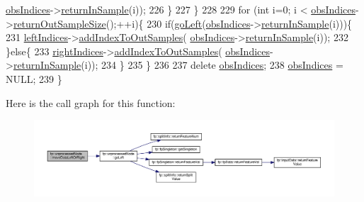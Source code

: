 \begin{DoxyCode}
      \hyperlink{classfp_1_1unprocessedNode_aba9f03124658f62906fa8ded53cef535}{obsIndices}->\hyperlink{classfp_1_1stratifiedInNodeClassIndices_a2d7e802fb97db0367bb8e8f31d393afd}{returnInSample}(i)); 
226                         \}
227                     \}
228 
229                     \textcolor{keywordflow}{for} (\textcolor{keywordtype}{int} i=0; i < \hyperlink{classfp_1_1unprocessedNode_aba9f03124658f62906fa8ded53cef535}{obsIndices}->\hyperlink{classfp_1_1stratifiedInNodeClassIndices_a6630b77af340d2023d88bafa87b94cae}{returnOutSampleSize}();++i)\{
230                         \textcolor{keywordflow}{if}(\hyperlink{classfp_1_1unprocessedNode_ad4ffdb4f4b91d6d21f8954f3c80a3617}{goLeft}(\hyperlink{classfp_1_1unprocessedNode_aba9f03124658f62906fa8ded53cef535}{obsIndices}->\hyperlink{classfp_1_1stratifiedInNodeClassIndices_a2d7e802fb97db0367bb8e8f31d393afd}{returnInSample}(i)))\{
231                             \hyperlink{classfp_1_1unprocessedNode_a8e39fa0144bbb78fd02d1973bd05b5f6}{leftIndices}->\hyperlink{classfp_1_1stratifiedInNodeClassIndices_adc99a046031545bc59c2b43abcf75ed9}{addIndexToOutSamples}(
      \hyperlink{classfp_1_1unprocessedNode_aba9f03124658f62906fa8ded53cef535}{obsIndices}->\hyperlink{classfp_1_1stratifiedInNodeClassIndices_a2d7e802fb97db0367bb8e8f31d393afd}{returnInSample}(i)); 
232                         \}\textcolor{keywordflow}{else}\{
233                             \hyperlink{classfp_1_1unprocessedNode_ac6886f626536370b1276374d4939291e}{rightIndices}->\hyperlink{classfp_1_1stratifiedInNodeClassIndices_adc99a046031545bc59c2b43abcf75ed9}{addIndexToOutSamples}(
      \hyperlink{classfp_1_1unprocessedNode_aba9f03124658f62906fa8ded53cef535}{obsIndices}->\hyperlink{classfp_1_1stratifiedInNodeClassIndices_a2d7e802fb97db0367bb8e8f31d393afd}{returnInSample}(i)); 
234                         \}
235                     \}
236 
237                     \textcolor{keyword}{delete} \hyperlink{classfp_1_1unprocessedNode_aba9f03124658f62906fa8ded53cef535}{obsIndices};
238                     \hyperlink{classfp_1_1unprocessedNode_aba9f03124658f62906fa8ded53cef535}{obsIndices} = NULL;
239                 \}
\end{DoxyCode}
Here is the call graph for this function\+:
\nopagebreak
\begin{figure}[H]
\begin{center}
\leavevmode
\includegraphics[width=350pt]{classfp_1_1unprocessedNode_a0236d2722cb4c32b8ff7e66fc118bed2_cgraph}
\end{center}
\end{figure}
\mbox{\label{classfp_1_1unprocessedNode_a0236d2722cb4c32b8ff7e66fc118bed2}} 
